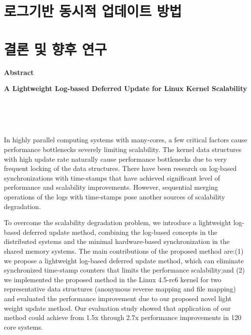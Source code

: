 \documentclass[doctor,korean,final]{kmu}
\begin{document}
\chapter{로그기반 동시적 업데이트 방법}




\chapter{결론 및 향후 연구}\label{sec:concl}


%

%



\newpage
{}%
\hfill \break

\noindent
\Large{\textbf{Abstract}}

\noindent
\Large{\textbf{A Lightweight Log-based Deferred Update for Linux Kernel
Scalability}}

\normalsize{
\hfill \break
\begin{center}
\\
\\
\\
\end{center}
\hfill \break

In highly parallel computing systems with many-cores, a few critical factors
cause performance bottlenecks severely limiting scalability.
The kernel data structures with high update rate naturally cause performance
bottlenecks due to very frequent locking of the data structures.
There have been research on log-based synchronizations with time-stamps that
have achieved significant level of performance and scalability improvements.
However, sequential merging operations of the logs with time-stamps pose another
sources of scalability degradation.

To overcome the scalability degradation problem, we introduce a lightweight
log-based deferred update method, combining the log-based concepts in the
distributed systems and the minimal hardware-based synchronization in the
shared memory systems.
The main contributions of the proposed method are:(1) we propose a lightweight
log-based deferred update method, which can eliminate synchronized time-stamp
counters that limits the performance scalability;and (2) we implemented the
 proposed method in the Linux 4.5-rc6 kernel for two representative data
 structures (anonymous reverse mapping and file mapping) and evaluated the
performance improvement due to our proposed novel light weight update method.
Our evaluation study showed that application of our method could
achieve from 1.5x through 2.7x performance improvements in 120 core
systems.}

\end{document}
